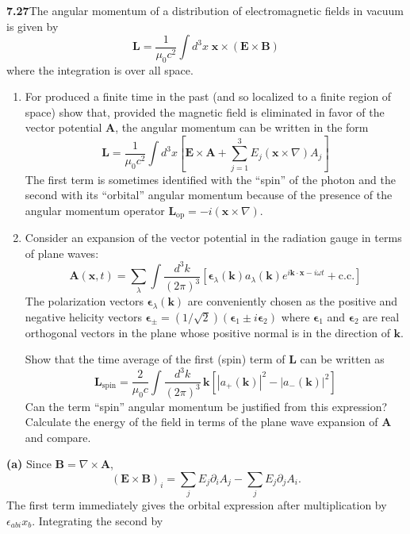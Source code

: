 \par\bigskip
\noindent\textbf{7.27}\quad The angular momentum of a distribution of electromagnetic fields in vacuum is given by
\[
\mathbf{L}=\frac{1}{\mu_{0}c^{2}}\int d^{3}x\;\mathbf{x}\times(\mathbf{E}\times\mathbf{B})
\]
where the integration is over all space.
\begin{enumerate}
\item[(a)] For  produced a finite time in the past (and so localized to a finite region of space) show that, provided the magnetic field is eliminated in favor of the vector potential $\mathbf{A}$, the angular momentum can be written in the form
\[
\mathbf{L}=\frac{1}{\mu_{0}c^{2}}\int d^{3}x\!\left[\mathbf{E}\times\mathbf{A}+\sum_{j=1}^{3}E_{j}(\mathbf{x}\times\nabla)A_{j}\right]
\]
The first term is sometimes identified with the ``spin'' of the photon and the second with its ``orbital'' angular momentum because of the presence of the angular momentum operator $\mathbf{L}_{\mathrm{op}}=-i(\mathbf{x}\times\nabla)$.
\item[(b)] Consider an expansion of the vector potential in the radiation gauge in terms of plane waves:
\[
\mathbf{A}(\mathbf{x},t)=\sum_{\lambda}\int\frac{d^{3}k}{(2\pi)^{3}}\left[\boldsymbol{\epsilon}_{\lambda}(\mathbf{k})a_{\lambda}(\mathbf{k})e^{i\mathbf{k}\cdot\mathbf{x}-i\omega t}+\text{c.c.}\right]
\]
The polarization vectors $\boldsymbol{\epsilon}_{\lambda}(\mathbf{k})$ are conveniently chosen as the positive and negative helicity vectors $\boldsymbol{\epsilon}_{\pm}=(1/\sqrt{2})(\boldsymbol{\epsilon}_{1}\pm i\boldsymbol{\epsilon}_{2})$ where $\boldsymbol{\epsilon}_{1}$ and $\boldsymbol{\epsilon}_{2}$ are real orthogonal vectors in the plane whose positive normal is in the direction of $\mathbf{k}$.

Show that the time average of the first (spin) term of $\mathbf{L}$ can be written as
\[
\mathbf{L}_{\mathrm{spin}}=\frac{2}{\mu_{0}c}\int\frac{d^{3}k}{(2\pi)^{3}}\,\mathbf{k}[|a_{+}(\mathbf{k})|^{2}-|a_{-}(\mathbf{k})|^{2}]
\]
Can the term ``spin'' angular momentum be justified from this expression? Calculate the energy of the field in terms of the plane wave expansion of $\mathbf{A}$ and compare.
\end{enumerate}
\solution
\textbf{(a)} Since $\mathbf B=\nabla\times\mathbf A$,
\[
(\mathbf E\times\mathbf B)_i
=\sum_j E_j\partial_iA_j-\sum_jE_j\partial_jA_i.
\]
The first term immediately gives the orbital expression after
multiplication by $\epsilon_{abi}x_b$. Integrating the second by

